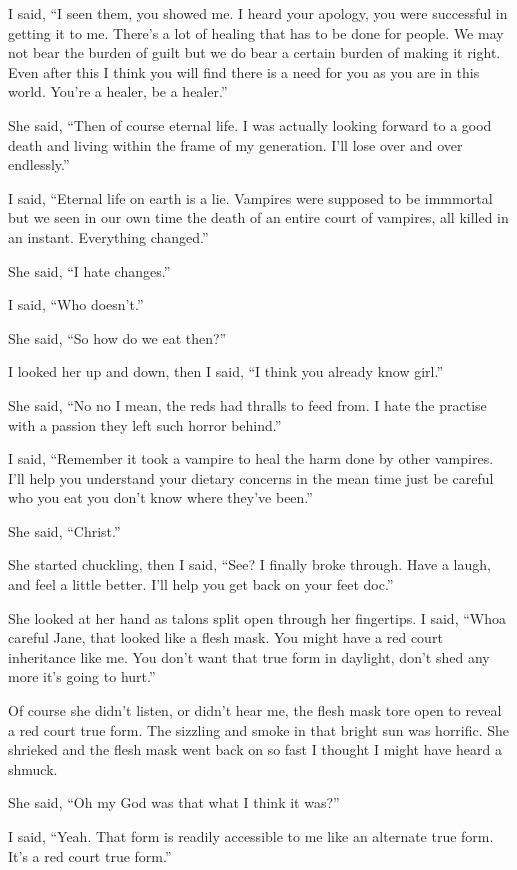 I said, ``I seen them, you showed me. I heard your apology, you were successful in getting it to me. There's a lot of healing that has to be done for people. We may not bear the burden of guilt but we do bear a certain burden of making it right. Even after this I think you will find there is a need for you as you are in this world. You're a healer, be a healer.''

She said, ``Then of course eternal life. I was actually looking forward to a good death and living within the frame of my generation. I'll lose over and over endlessly.''

I said, ``Eternal life on earth is a lie. Vampires were supposed to be immmortal but we seen in our own time the death of an entire court of vampires, all killed in an instant. Everything changed.''

She said, ``I hate changes.''

I said, ``Who doesn't.''

She said, ``So how do we eat then?''

I looked her up and down, then I said, ``I think you already know girl.''

She said, ``No no I mean, the reds had thralls to feed from. I hate the practise with a passion they left such horror behind.''

I said, ``Remember it took a vampire to heal the harm done by other vampires. I'll help you understand your dietary concerns in the mean time just be careful who you eat you don't know where they've been.''

She said, ``Christ.''

She started chuckling, then I said, ``See? I finally broke through. Have a laugh, and feel a little better. I'll help you get back on your feet doc.''

She looked at her hand as talons split open through her fingertips. I said, ``Whoa careful Jane, that looked like a flesh mask. You might have a red court inheritance like me. You don't want that true form in daylight, don't shed any more it's going to hurt.''

Of course she didn't listen, or didn't hear me, the flesh mask tore open to reveal a red court true form. The sizzling and smoke in that bright sun was horrific. She shrieked and the flesh mask went back on so fast I thought I might have heard a shmuck.

She said, ``Oh my God was that what I think it was?''

I said, ``Yeah. That form is readily accessible to me like an alternate true form. It's a red court true form.''

